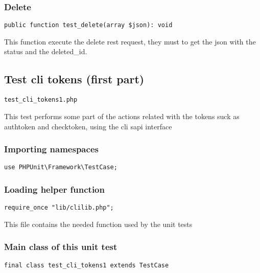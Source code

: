 \documentclass[a4paper]{article}
\begin{document}
\hypertarget{toc30}{}
\subsubsection{Delete}

\begin{lstlisting}
public function test_delete(array $json): void
\end{lstlisting}

This function execute the delete rest request, they must to get the json
with the status and the deleted\_id.

\hypertarget{toc31}{}
\subsection{Test cli tokens (first part)}

\begin{lstlisting}
test_cli_tokens1.php
\end{lstlisting}

This test performs some part of the actions related with the tokens suck
as authtoken and checktoken, using the cli sapi interface

\hypertarget{toc32}{}
\subsubsection{Importing namespaces}

\begin{lstlisting}
use PHPUnit\Framework\TestCase;
\end{lstlisting}

\hypertarget{toc33}{}
\subsubsection{Loading helper function}

\begin{lstlisting}
require_once "lib/clilib.php";
\end{lstlisting}

This file contains the needed function used by the unit tests

\hypertarget{toc34}{}
\subsubsection{Main class of this unit test}

\begin{lstlisting}
final class test_cli_tokens1 extends TestCase
\end{lstlisting}
\end{document}
